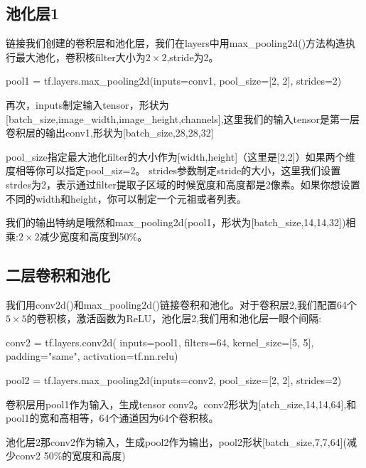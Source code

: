 \subsection{池化层1}
链接我们创建的卷积层和池化层，我们在layers中用max\_pooling2d()方法构造执行最大池化，卷积核filter大小为$2\times2$,stride为2。
\begin{python}
pool1 = tf.layers.max_pooling2d(inputs=conv1, pool_size=[2, 2], strides=2)
\end{python}
再次，inputs制定输入tensor，形状为[batch\_size,image\_width,image\_height,channels],这里我们的输入tensor是第一层卷积层的输出conv1,形状为[batch\_size,28,28,32]

pool\_size指定最大池化filter的大小作为[width,height]（这里是[2,2]）如果两个维度相等你可以指定pool\_siz=2。
strides参数制定stride的大小，这里我们设置strdes为2，表示通过filter提取子区域的时候宽度和高度都是2像素。如果你想设置不同的width和height，你可以制定一个元祖或者列表。

我们的输出特纳是哦然和max\_pooling2d(pool1，形状为[batch\_size,14,14,32])相乘:$2\times2$减少宽度和高度到50\%。
\subsection{二层卷积和池化}
我们用conv2d()和max\_pooling2d()链接卷积和池化。对于卷积层2,我们配置64个$5\times5$的卷积核，激活函数为ReLU，池化层2,我们用和池化层一眼个间隔:
\begin{python}
conv2 = tf.layers.conv2d(
    inputs=pool1,
    filters=64,
    kernel_size=[5, 5],
    padding="same",
    activation=tf.nn.relu)

pool2 = tf.layers.max_pooling2d(inputs=conv2, pool_size=[2, 2], strides=2)
\end{python}
卷积层用pool1作为输入，生成tensor conv2。conv2形状为[atch\_size,14,14,64],和pool1的宽和高相等，64个通道因为64个卷积核。

池化层2那conv2作为输入，生成pool2作为输出，pool2形状[batch\_size,7,7,64](减少conv2 50\%的宽度和高度)
